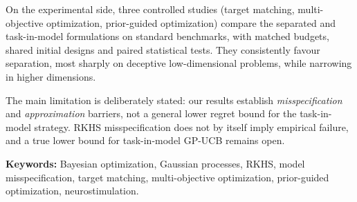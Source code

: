 On the experimental side, three controlled studies (target matching,
multi-objective optimization, prior-guided optimization) compare the separated
and task-in-model formulations on standard benchmarks, with matched budgets,
shared initial designs and paired statistical tests. They consistently favour
separation, most sharply on deceptive low-dimensional problems, while narrowing
in higher dimensions.

The main limitation is deliberately stated: our results establish
\emph{misspecification} and \emph{approximation} barriers, not a general lower
regret bound for the task-in-model strategy. RKHS misspecification does not by
itself imply empirical failure, and a true lower bound for task-in-model GP-UCB
remains open.

\vspace{0.4cm}
\noindent\textbf{Keywords:} Bayesian optimization, Gaussian processes, RKHS,
model misspecification, target matching, multi-objective optimization,
prior-guided optimization, neurostimulation.
